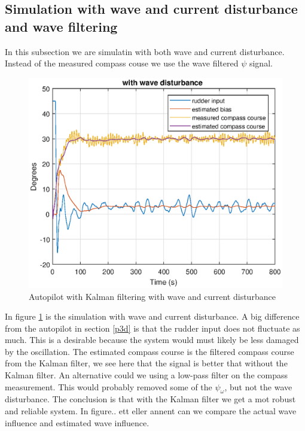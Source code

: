 \subsection{Simulation with wave and current disturbance and wave filtering}
In this subsection we are simulatin with both wave and current disturbance. Instead of the measured compass couse we use the wave filtered $\psi$ signal.  
\newline
\begin{figure}[H]
    \centering
    \includegraphics[width=0.8\linewidth]{Part5_pics/ny_p5e.eps}
    \caption{Autopilot with Kalman filtering with wave and current disturbance}
    \label{fig:p5e}
\end{figure}
In figure \ref{fig:p5e} is the simulation with wave and current disturbance. A big difference from the autopilot in section \ref{p3d} is that the rudder input does not fluctuate as much. This is a desirable because the system would must likely be less damaged by the oscillation.\newline 
The estimated compass course is the filtered compass course from the Kalman filter, we see here that the signal is better that without the Kalman filter.\newline 
An alternative could we using a low-pass filter on the compass measurement. This would probably removed some of the $\psi_\omega$, but not the wave disturbance.  The conclusion is that with the Kalman filter we get a mot robust and reliable system. 
\bigskip
In figure.. ett eller annent can we compare the actual wave influence and estimated wave influence. 